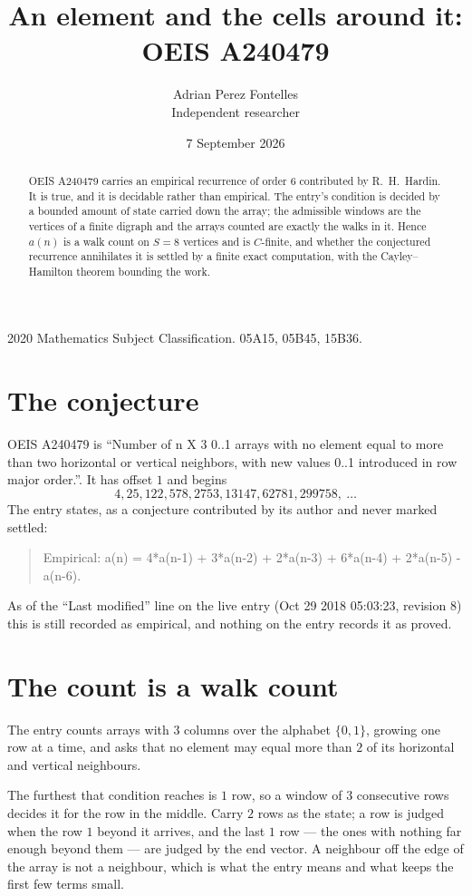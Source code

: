 \documentclass[11pt,a4paper]{article}
\title{An element and the cells around it: OEIS A240479}
\author{Adrian Perez Fontelles\\ \small Independent researcher}
\date{7 September 2026}
\theoremstyle{plain}
\theoremstyle{definition}
\begin{document}
\maketitle

\begin{abstract}
OEIS A240479 carries an empirical recurrence of order $6$ contributed by R.~H.~Hardin. It is
true, and it is decidable rather than empirical. The entry's condition is decided by a bounded amount of state carried down the array; the
admissible windows are the vertices of a finite digraph and the arrays counted are exactly the
walks in it. Hence $a(n)$ is a walk count on $S=8$ vertices and is $C$-finite, and whether the
conjectured recurrence annihilates it is settled by a finite exact computation, with the
Cayley--Hamilton theorem bounding the work.
\end{abstract}

\noindent\small 2020 Mathematics Subject Classification. 05A15, 05B45, 15B36.\normalsize

\section{The conjecture}

OEIS A240479 is ``Number of n X 3 0..1 arrays with no element equal to more than two horizontal or vertical neighbors, with new values 0..1 introduced in row major order.''. It has offset $1$ and begins
\[
4, 25, 122, 578, 2753, 13147, 62781, 299758,\ \dots
\]
The entry states, as a conjecture contributed by its author and never marked settled:
\begin{quote}
Empirical: a(n) = 4*a(n-1) + 3*a(n-2) + 2*a(n-3) + 6*a(n-4) + 2*a(n-5) - a(n-6).
\end{quote}
As of the ``Last modified'' line on the live entry (Oct 29 2018 05:03:23, revision 8) this is still
recorded as empirical, and nothing on the entry records it as proved.

\section{The count is a walk count}

The entry counts arrays with $3$ columns over the alphabet $\{0,1\}$, growing one row at a time, and asks that no element may equal more than $2$ of its horizontal and vertical neighbours.

The furthest that condition reaches is $1$ row, so a window of $3$ consecutive rows decides it for the row in the middle. Carry $2$ rows as the state; a row is judged when the row $1$ beyond it arrives, and the last $1$ row --- the ones with nothing far enough beyond them --- are judged by the end vector. A neighbour off the edge of the array is not a neighbour, which is what the entry means and what keeps the first few terms small.
\end{document}
